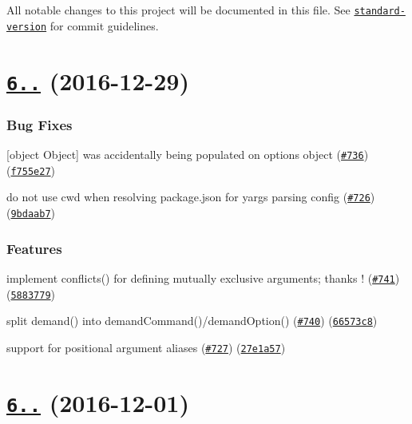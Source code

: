 All notable changes to this project will be documented in this file. See \href{https://github.com/conventional-changelog/standard-version}{\tt standard-\/version} for commit guidelines.

\label{_6.6.0}%
 \section*{\href{https://github.com/yargs/yargs/compare/v6.5.0...v6.6.0}{\tt 6..} (2016-\/12-\/29)}

\subsubsection*{Bug Fixes}


\begin{DoxyItemize}
\item \mbox{[}object Object\mbox{]} was accidentally being populated on options object (\href{https://github.com/yargs/yargs/issues/736}{\tt \#736}) (\href{https://github.com/yargs/yargs/commit/f755e27}{\tt f755e27})
\item do not use cwd when resolving package.\+json for yargs parsing config (\href{https://github.com/yargs/yargs/issues/726}{\tt \#726}) (\href{https://github.com/yargs/yargs/commit/9bdaab7}{\tt 9bdaab7})
\end{DoxyItemize}

\subsubsection*{Features}


\begin{DoxyItemize}
\item implement conflicts() for defining mutually exclusive arguments; thanks \href{https://github.com/madcampos}{\tt }! (\href{https://github.com/yargs/yargs/issues/741}{\tt \#741}) (\href{https://github.com/yargs/yargs/commit/5883779}{\tt 5883779})
\item split demand() into demand\+Command()/demand\+Option() (\href{https://github.com/yargs/yargs/issues/740}{\tt \#740}) (\href{https://github.com/yargs/yargs/commit/66573c8}{\tt 66573c8})
\item support for positional argument aliases (\href{https://github.com/yargs/yargs/issues/727}{\tt \#727}) (\href{https://github.com/yargs/yargs/commit/27e1a57}{\tt 27e1a57})
\end{DoxyItemize}

\label{_6.5.0}%
 \section*{\href{https://github.com/yargs/yargs/compare/v6.4.0...v6.5.0}{\tt 6..} (2016-\/12-\/01)}


